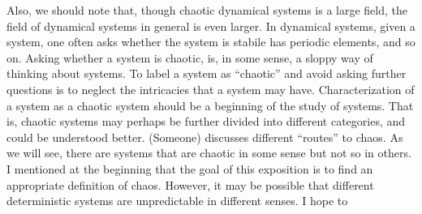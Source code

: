 \documentclass[12pt,twoside,draft]{book}
\begin{document}
Also, we should note that, though chaotic dynamical systems is a large field, the field of dynamical systems in general is even larger.
In dynamical systems, given a system, one often asks whether the system is stabile has periodic elements, and so on.
Asking whether a system is chaotic, is, in some sense, a sloppy way of thinking about systems.
To label a system as ``chaotic'' and avoid asking further questions is to neglect the intricacies that a system may have.
Characterization of a system as a chaotic system should be a beginning of the study of systems.
That is, chaotic systems may perhaps be further divided into different categories, and could be understood better.
(Someone) discusses different ``routes'' to chaos.
As we will see, there are systems that are chaotic in some sense but not so in others.
I mentioned at the beginning that the goal of this exposition is to find an appropriate definition of chaos.
However, it may be possible that different deterministic systems are unpredictable in different senses.
I hope to 
\end{document}
